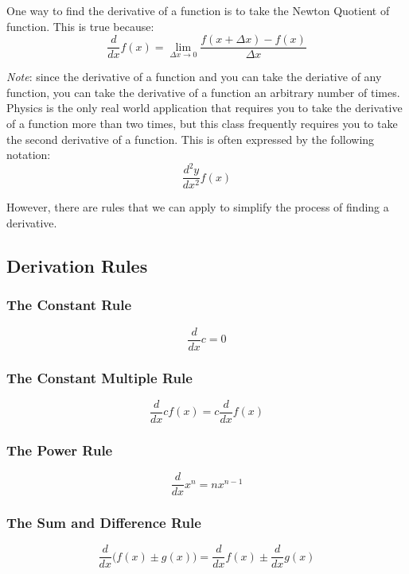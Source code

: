One way to find the derivative of a function is to take the Newton Quotient of
function.  This is true because:
\begin{equation}
\frac{d}{dx}f(x)=\lim_{\Delta x\to 0} \frac{f(x+\Delta x)-f(x)}{\Delta x}
\end{equation}

\textit{Note}: since the derivative of a function and you can take the deriative
of any function, you can take the derivative of a function an arbitrary number
of times. Physics is the only real world application that requires you to take
the derivative of a function more than two times, but this class frequently
requires you to take the second derivative of a function.  This is often
expressed by the following notation:
\begin{equation}
\frac{d^2y}{dx^2}f(x)
\end{equation}

However, there are rules that we can apply to simplify the process of finding a
derivative.

\subsection{Derivation Rules}
\subsubsection{The Constant Rule}
\begin{equation}
\frac{d}{dx}c=0
\end{equation}

\subsubsection{The Constant Multiple Rule}
\begin{equation}
\frac{d}{dx}cf(x)=c\frac{d}{dx}f(x)
\end{equation}

\subsubsection{The Power Rule}
\begin{equation}
\frac{d}{dx}x^n=nx^{n-1}
\end{equation}

\subsubsection{The Sum and Difference Rule}
\begin{equation}
\frac{d}{dx}\big(f(x)\pm g(x)\big)=\frac{d}{dx}f(x) \pm \frac{d}{dx}g(x)
\end{equation}


